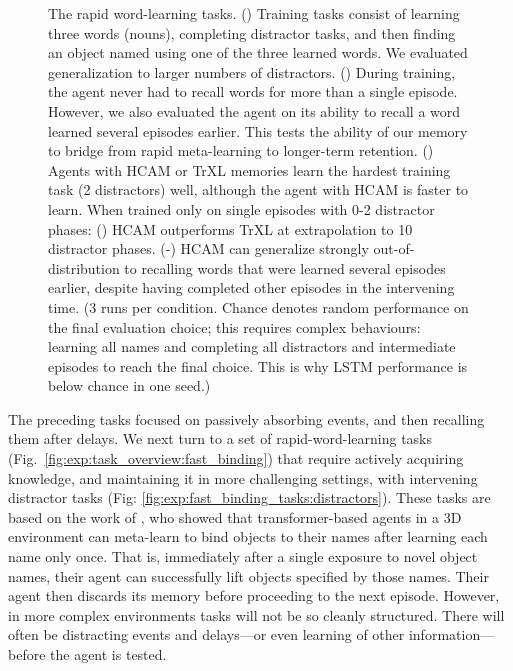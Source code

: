 \documentclass{article}
\begin{document}
\begin{figure}[tbh]
    \caption{The rapid word-learning tasks. () Training tasks consist of learning three words (nouns), completing distractor tasks, and then finding an object named using one of the three learned words. We evaluated generalization to larger numbers of distractors. () During training, the agent never had to recall words for more than a single episode. However, we also evaluated the agent on its ability to recall a word learned several episodes earlier. This tests the ability of our memory to bridge from rapid meta-learning to longer-term retention. () Agents with HCAM or TrXL memories learn the hardest training task (2 distractors) well, although the agent with HCAM is faster to learn. When trained only on single episodes with 0-2 distractor phases: () HCAM outperforms TrXL at extrapolation to 10 distractor phases. (-) HCAM can generalize strongly out-of-distribution to recalling words that were learned several episodes earlier, despite having completed other episodes in the intervening time. (3 runs per condition. Chance denotes random performance on the final evaluation choice; this requires complex behaviours: learning all names and completing all distractors and intermediate episodes to reach the final choice. This is why LSTM performance is below chance in one seed.)}
    \label{fig:exp:fast_binding}
    \vspace{-1.1em}
\end{figure}

The preceding tasks focused on passively absorbing events, and then recalling them after delays. We next turn to a set of rapid-word-learning tasks (Fig.\ \ref{fig:exp:task_overview:fast_binding}) that require actively acquiring knowledge, and maintaining it in more challenging settings, with intervening distractor tasks (Fig: \ref{fig:exp:fast_binding_tasks:distractors}). These tasks are based on the work of \citet{hill2020grounded}, who showed that transformer-based agents in a 3D environment can meta-learn to bind objects to their names after learning each name only once. That is, immediately after a single exposure to novel object names, their agent can successfully lift objects specified by those names. Their agent then discards its memory before proceeding to the next episode. However, in more complex environments tasks will not be so cleanly structured. There will often be distracting events and delays---or even learning of other information---before the agent is tested.
\end{document}
